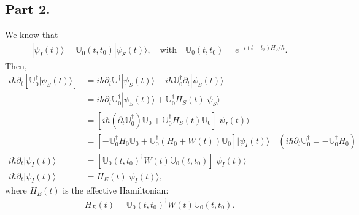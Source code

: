 \documentclass[letterpaper,11pt,twoside]{article}
\newcommand{\ket}[1]{|#1\rangle}
\begin{document}
\subsection*{Part 2.}
We know that 
\begin{align*}
  \ket{\psi_I(t)}=\mathbb{U}_0^\dagger(t,t_0)\ket{\psi_S(t)},\quad\text{with}\quad\mathbb{U}_0(t,t_0)=e^{-i(t-t_0)H_0/\hbar}.
\end{align*}
Then,
{
\begin{align*}
  i\hbar\partial_t\left[\mathbb{U}_0^\dagger\ket{\psi_S(t)}\right]&=i\hbar\partial_t\mathbb{U}^\dagger\ket{\psi_S(t)}+i\hbar\mathbb{U}_0^\dagger\partial_t\ket{\psi_S(t)}\\
  &=i\hbar\partial_t\mathbb{U}_0^\dagger\ket{\psi_S(t)}+\mathbb{U}_0^\dagger H_S(t)\ket{\psi_S}\\
  &=\left[i\hbar(\partial_t\mathbb{U}_0^\dagger)\mathbb{U}_0+\mathbb{U}_0^\dagger H_S(t)\mathbb{U}_0\right]\ket{\psi_I(t)}\\
  &=\left[-\mathbb{U}_0^\dagger H_0\mathbb{U}_0+\mathbb{U}_0^\dagger(H_0+W(t))\mathbb{U}_0\right]\ket{\psi_I(t)}\quad(i\hbar\partial_t\mathbb{U}^\dagger_0=-\mathbb{U}_0^\dagger H_0)\\
  i\hbar\partial_t\ket{\psi_I(t)}&=\left[\mathbb{U}_0(t,t_0)^\dagger W(t)\mathbb{U}_0(t,t_0)\right]\ket{\psi_I(t)}\\
  i\hbar\partial_t\ket{\psi_I(t)}&=H_E(t)\ket{\psi_I(t)},
\end{align*}}
where $H_E(t)$ is the effective Hamiltonian:
\begin{align*}
  H_E(t)=\mathbb{U}_0(t,t_0)^\dagger W(t)\mathbb{U}_0(t,t_0).
\end{align*}
\end{document}
